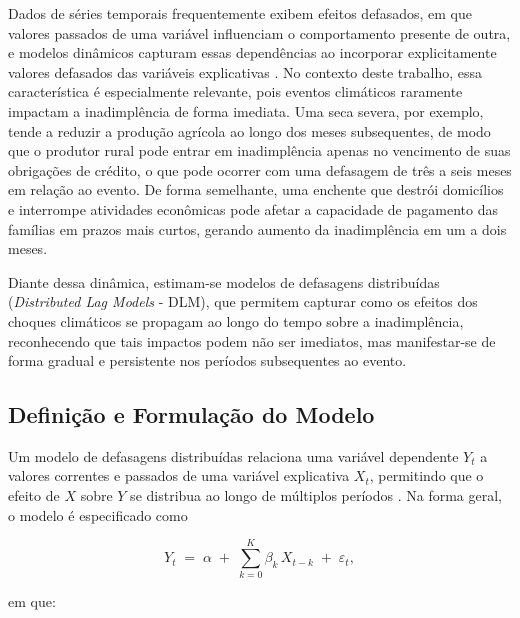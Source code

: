 Dados de séries temporais frequentemente exibem efeitos defasados, em que valores passados
de uma variável influenciam o comportamento presente de outra, e modelos dinâmicos capturam
essas dependências ao incorporar explicitamente valores defasados das variáveis explicativas
\citep{almon1965}. No contexto deste trabalho, essa característica é especialmente relevante, pois
eventos climáticos raramente impactam a inadimplência de forma imediata. Uma seca severa,
por exemplo, tende a reduzir a produção agrícola ao longo dos meses subsequentes, de modo
que o produtor rural pode entrar em inadimplência apenas no vencimento de suas obrigações
de crédito, o que pode ocorrer com uma defasagem de três a seis meses em relação ao evento.
De forma semelhante, uma enchente que destrói domicílios e interrompe atividades econômicas
pode afetar a capacidade de pagamento das famílias em prazos mais curtos, gerando aumento
da inadimplência em um a dois meses.

Diante dessa dinâmica, estimam-se modelos de defasagens distribuídas (\textit{Distributed Lag
Models} - DLM), que permitem capturar como os efeitos dos choques climáticos se propagam ao
longo do tempo sobre a inadimplência, reconhecendo que tais impactos podem não ser imediatos,
mas manifestar-se de forma gradual e persistente nos períodos subsequentes ao evento.

\subsection{Definição e Formulação do Modelo}

Um modelo de defasagens distribuídas relaciona uma variável dependente $Y_t$ a valores
correntes e passados de uma variável explicativa $X_t$, permitindo que o efeito de $X$ sobre $Y$
se distribua ao longo de múltiplos períodos \citep{almon1965}. Na forma geral, o modelo é
especificado como

\begin{equation}
    Y_t \;=\; \alpha \;+\; \sum_{k=0}^{K} \beta_k\, X_{t-k} \;+\; \varepsilon_t,
    \label{eq:dlm_geral}
\end{equation}

\noindent em que:

